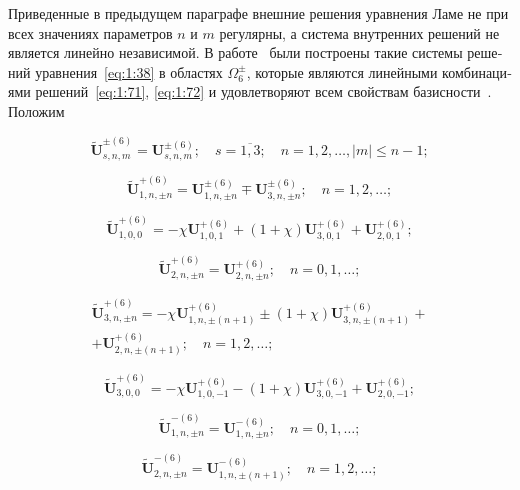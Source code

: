 \begin{russian}
Приведенные в предыдущем параграфе внешние решения уравнения Ламе не при всех значениях параметров $n$ и $m$ регулярны, а система внутренних решений не является линейно независимой. В работе~\cite{Nikolaev1993} были построены такие системы решений уравнения~\eqref{eq:1:38} в областях $\Omega_6^{\pm}$, которые являются линейными комбинациями решений~\eqref{eq:1:71}, \eqref{eq:1:72} и удовлетворяют всем свойствам базисности~\cite{Nikolaev1998}. Положим

\begin{equation}\label{eq:1:89o}
\mathbf{\tilde U}_{s,n,m}^{\pm(6)}=\mathbf{U}_{s,n,m}^{\pm(6)};\quad s=\overline{1,3};\quad n=1,2,\dots, |m|\le n-1;
\end{equation}

\begin{equation}\label{eq:1:90o}
\mathbf{\tilde U}_{1,n,\pm n}^{+(6)}=\mathbf{U}_{1,n,\pm n}^{\pm(6)}\mp\mathbf{U}_{3,n,\pm n}^{\pm(6)};\quad n=1,2,\dots;
\end{equation}

\begin{equation}\label{eq:1:91o}
\mathbf{\tilde U}_{1,0,0}^{+(6)}=-\chi\mathbf{U}_{1,0,1}^{+(6)}+(1+\chi)\mathbf{U}_{3,0,1}^{+(6)}+
\mathbf{U}_{2,0,1}^{+(6)};
\end{equation}

\begin{equation}\label{eq:1:92o}
\mathbf{\tilde U}_{2,n,\pm n}^{+(6)}=\mathbf{U}_{2,n,\pm n}^{+(6)};\quad n=0,1,\dots;
\end{equation}

\begin{multline}\label{eq:1:93o}
\mathbf{\tilde U}_{3,n,\pm n}^{+(6)}=-\chi\mathbf{U}_{1,n,\pm (n+1)}^{+(6)}\pm(1+\chi)\mathbf{U}_{3,n,\pm (n+1)}^{+(6)}+ \\
+\mathbf{U}_{2,n,\pm (n+1)}^{+(6)};\quad n=1,2,\dots;
\end{multline}

\begin{equation}\label{eq:1:94o}
\mathbf{\tilde U}_{3,0,0}^{+(6)}=-\chi\mathbf{U}_{1,0,-1}^{+(6)}-(1+\chi)\mathbf{U}_{3,0,-1}^{+(6)}+
\mathbf{U}_{2,0,-1}^{+(6)};
\end{equation}

\begin{equation}\label{eq:1:95o}
\mathbf{\tilde U}_{1,n,\pm n}^{-(6)}=\mathbf{U}_{1,n,\pm n}^{-(6)};\quad n=0,1,\dots;
\end{equation}

\begin{equation}\label{eq:1:96o}
\mathbf{\tilde U}_{2,n,\pm n}^{-(6)}=\mathbf{U}_{1,n,\pm (n+1)}^{-(6)};\quad n=1,2,\dots;
\end{equation}


\end{russian}
